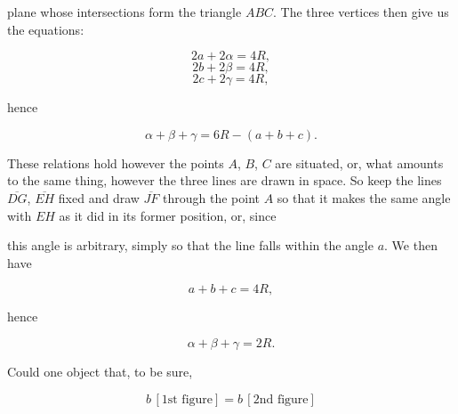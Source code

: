 %
plane whose intersections form the triangle $ABC$. The three vertices then give us the equations:

\[ 2a + 2\alpha = 4R, \]
\[ 2b + 2\beta = 4R, \]
\[ 2c + 2\gamma = 4R, \]

\noindent hence

\[ \alpha + \beta + \gamma = 6R - (a+b+c). \]

These relations hold however the points $A$, $B$, $C$ are situated, or, what amounts to the same thing, however the three lines are drawn in space. So keep the lines $\overline{DG}$, $\overline{EH}$ fixed and draw $\overline{JF}$ through the point $A$ so that it makes the same angle with $EH$ as it did in its former position, or, since

\begin{center}

\par [Fig. 2.]
\end{center}

\noindent this angle is arbitrary, simply so that the line falls within the angle $a$. We then have

\[ a + b + c = 4R, \]

\noindent hence

\[ \alpha + \beta + \gamma = 2R. \]

Could one object that, to be sure,

\[ b\,[\text{1st figure}] = b\,[\text{2nd figure}] \]
